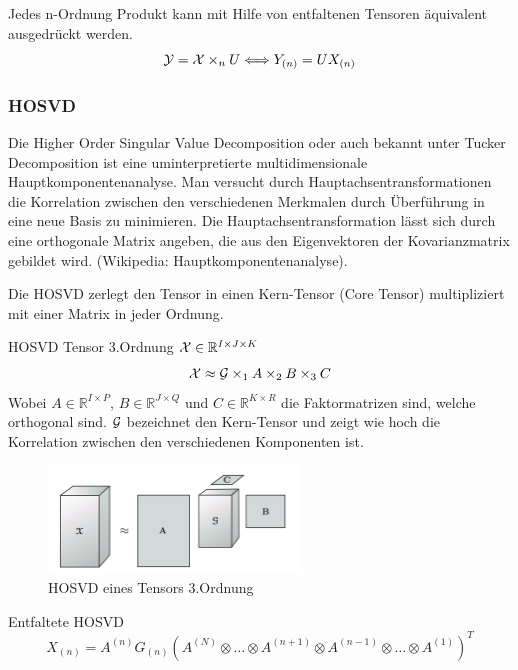 \begin{Bemerkung}
Jedes n-Ordnung Produkt kann mit Hilfe von entfaltenen Tensoren äquivalent ausgedrückt werden.
\begin{equation}
{\cal Y} = {\cal X} \times_n U \Longleftrightarrow Y_{(n)} = UX_{(n)}
\end{equation}
\end{Bemerkung}

\subsubsection{HOSVD}

Die Higher Order Singular Value Decomposition oder auch bekannt unter Tucker Decomposition ist eine uminterpretierte multidimensionale Hauptkomponentenanalyse. Man versucht durch Hauptachsentransformationen die Korrelation zwischen den verschiedenen Merkmalen durch Überführung in eine neue Basis zu minimieren. Die Hauptachsentransformation lässt sich durch eine orthogonale Matrix angeben, die aus den Eigenvektoren der Kovarianzmatrix gebildet wird. (Wikipedia: Hauptkomponentenanalyse).

Die HOSVD zerlegt den Tensor in einen Kern-Tensor (Core Tensor) multipliziert mit einer Matrix in jeder Ordnung. 

\begin{Beispiel} HOSVD Tensor 3.Ordnung
${\cal X}  \in \mathbb{R}^{I \times J \times K}$
\begin{equation}
{\cal X} \approx {\cal G} \times_1 A \times_2 B \times_3 C 
\end{equation}
Wobei $A \in \mathbb{R}^{I \times P}$, $B \in \mathbb{R}^{J \times Q}$ und $C \in \mathbb{R}^{K \times R}$ die Faktormatrizen sind, welche orthogonal sind.
${\cal G}$ bezeichnet den Kern-Tensor und zeigt wie hoch die Korrelation zwischen den verschiedenen Komponenten ist.
\end{Beispiel}

\begin{figure}[ht]
	\centering
  \includegraphics[width=0.6\textwidth]{hosvdTensor.png}
	\caption{HOSVD eines Tensors 3.Ordnung}
	\label{fig:hosvdTensor}
\end{figure}

\begin{Bemerkung} Entfaltete HOSVD \\
\begin{equation}
X_{(n)} = A^{(n)} G_{(n)} ( A^{(N)} \otimes \dots \otimes A^{(n+1)} \otimes A^{(n-1)} \otimes \dots \otimes A^{(1)} )^{T}
\end{equation}
\end{Bemerkung}